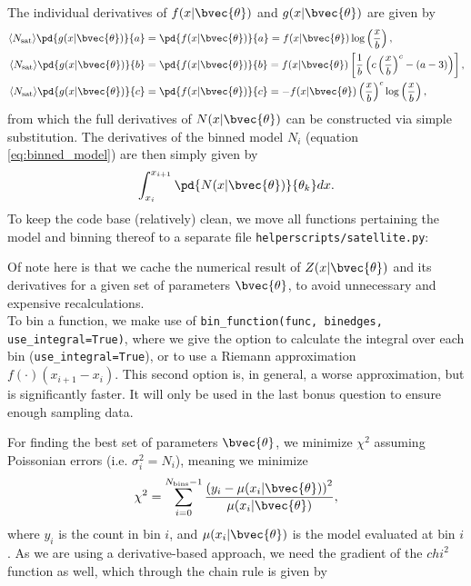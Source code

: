 The individual derivatives of $f(x|\bvec{\theta})$ and $g(x|\bvec{\theta})$ are given by
\begin{align}
    \langle N_\text{sat}\rangle \pd{g(x|\bvec{\theta})}{a} &= \pd{f(x|\bvec{\theta})}{a} = f(x|\bvec{\theta}) \log\left(\frac{x}{b}\right),\\
    \langle N_\text{sat}\rangle \pd{g(x|\bvec{\theta})}{b} &= \pd{f(x|\bvec{\theta})}{b} = f(x|\bvec{\theta}) \left[\frac{1}{b}\left(c\left(\frac{x}{b}\right)^c - (a-3)\right)\right],\\
    \langle N_\text{sat}\rangle \pd{g(x|\bvec{\theta})}{c} &= \pd{f(x|\bvec{\theta})}{c} = -f(x|\bvec{\theta}) \left(\frac{x}{b}\right)^c\log\left(\frac{x}{b}\right),
\end{align}
from which the full derivatives of $N(x|\bvec{\theta})$ can be constructed via simple substitution. The derivatives of the binned model $N_i$ (equation \eqref{eq:binned_model}) are then simply given by
\begin{equation}
    \int_{x_i}^{x_{i+1}} \pd{N(x|\bvec{\theta})}{\theta_k}dx.
\end{equation}
To keep the code base (relatively) clean, we move all functions pertaining the model and binning thereof to a separate file \verb|helperscripts/satellite.py|:

Of note here is that we cache the numerical result of $Z(x|\bvec{\theta})$ and its derivatives for a given set of parameters $\bvec{\theta}$, to avoid unnecessary and expensive recalculations.\\
To bin a function, we make use of \verb|bin_function(func, binedges, use_integral=True)|, where we give the option to calculate the integral over each bin (\verb|use_integral=True|), or to use a Riemann approximation $f(\cdot)(x_{i+1}-x_i)$. This second option is, in general, a worse approximation, but is significantly faster. It will only be used in the last bonus question to ensure enough sampling data.

For finding the best set of parameters $\bvec{\theta}$, we minimize $\chi^2$ assuming Poissonian errors (i.e. $\sigma_i^2 = N_i$), meaning we minimize
\begin{equation}
    \chi^2 = \sum_{i=0}^{N_\text{bins}-1}\frac{\left(y_i - \mu(x_i|\bvec{\theta})\right)^2}{\mu(x_i|\bvec{\theta})},
\end{equation}
where $y_i$ is the count in bin $i$, and $\mu(x_i|\bvec{\theta})$ is the model evaluated at bin $i$. As we are using a derivative-based approach, we need the gradient of the $chi^2$ function as well, which through the chain rule is given by

